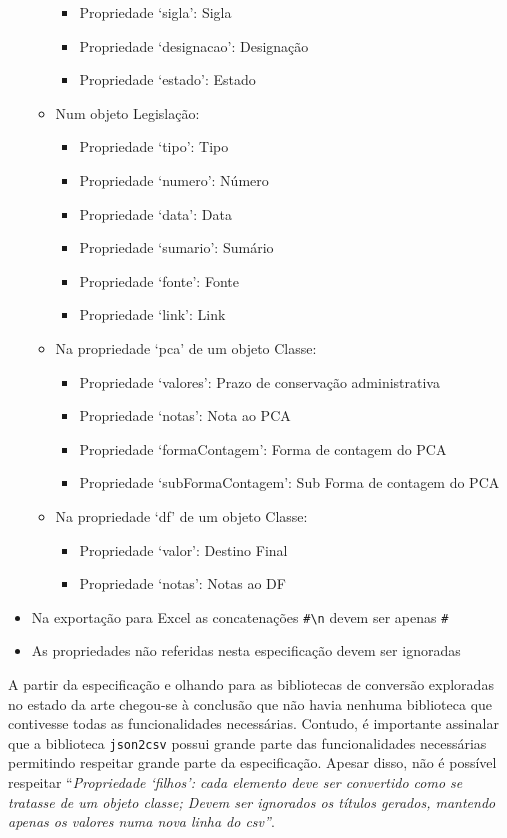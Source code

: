 \begin{itemize}
\begin{itemize}
        \begin{itemize}
            \item Propriedade `sigla': Sigla
            \item Propriedade `designacao': Designação
            \item Propriedade `estado': Estado
        \end{itemize}
        \item Num objeto Legislação:
        \begin{itemize}
            \item Propriedade `tipo': Tipo
            \item Propriedade `numero': Número
            \item Propriedade `data': Data
            \item Propriedade `sumario': Sumário
            \item Propriedade `fonte': Fonte
            \item Propriedade `link': Link
        \end{itemize}
        \item Na propriedade `pca' de um objeto Classe:
        \begin{itemize}
            \item Propriedade `valores': Prazo de conservação administrativa
            \item Propriedade `notas': Nota ao PCA
            \item Propriedade `formaContagem': Forma de contagem do PCA
            \item Propriedade `subFormaContagem': Sub Forma de contagem do PCA
        \end{itemize}
        \item Na propriedade `df' de um objeto Classe:
        \begin{itemize}
            \item Propriedade `valor': Destino Final
            \item Propriedade `notas': Notas ao DF
        \end{itemize}
    \end{itemize}
    \item Na exportação para Excel as concatenações \verb|#\n| devem ser apenas \verb|#|
    \item As propriedades não referidas nesta especificação devem ser ignoradas
\end{itemize}

A partir da especificação e olhando para as bibliotecas de conversão exploradas no estado da arte chegou-se à 
conclusão que não havia nenhuma biblioteca que contivesse todas as funcionalidades necessárias. 
Contudo, é importante assinalar que a biblioteca \texttt{json2csv} possui grande parte das funcionalidades 
necessárias permitindo respeitar grande parte da especificação. Apesar disso, não é possível 
respeitar ``\textit{Propriedade `filhos': cada elemento deve ser convertido como se tratasse de um objeto classe; 
Devem ser ignorados os títulos gerados, mantendo apenas os valores numa nova linha do \acrshort{csv}''}. 

